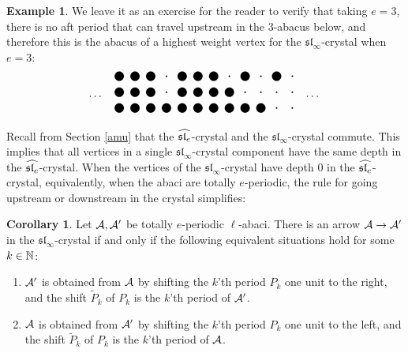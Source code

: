 \documentclass[12pt]{amsart}
\numberwithin{equation}{section}
\theoremstyle{definition}
\newtheorem{corollary}[equation]{Corollary}
\newtheorem{example}[equation]{Example}
\newcommand\TikZ[1]{\begin{matrix}\begin{tikzpicture}#1\end{tikzpicture}\end{matrix}}
\newcommand{\slinf}{\mathfrak{sl}_\infty}
\begin{document}
\begin{example} We leave it as an exercise for the reader to verify that taking $e=3$, there is no aft period that can travel upstream in the $3$-abacus below, and therefore this is the abacus of a highest weight vertex for the $\slinf$-crystal when $e=3$:
$$\dots\quad\TikZ{[scale=.5]
\draw
(11,0)node[fill,circle,inner sep=.5pt]{}
(11,1)node[fill,circle,inner sep=.5pt]{}
(11,2)node[fill,circle,inner sep=.5pt]{}
(10,0)node[fill,circle,inner sep=.5pt]{}
(10,1)node[fill,circle,inner sep=.5pt]{}
(10,2)node[fill,circle,inner sep=3pt]{}
(9,0)node[fill,circle,inner sep=3pt]{}
(9,1)node[fill,circle,inner sep=.5pt]{}
(9,2)node[fill,circle,inner sep=.5pt]{}
(8,0)node[fill,circle,inner sep=3pt]{}
(8,1)node[fill,circle,inner sep=.5pt]{}
(8,2)node[fill,circle,inner sep=3pt]{}
(7,0)node[fill,circle,inner sep=3pt]{}
(7,1)node[fill,circle,inner sep=3pt]{}
(7,2)node[fill,circle,inner sep=.5pt]{}
(6,0)node[fill,circle,inner sep=3pt]{}
(6,1)node[fill,circle,inner sep=3pt]{}
(6,2)node[fill,circle,inner sep=3pt]{}
(5,0)node[fill,circle,inner sep=3pt]{}
(5,1)node[fill,circle,inner sep=3pt]{}
(5,2)node[fill,circle,inner sep=3pt]{}
(4,0)node[fill,circle,inner sep=3pt]{}
(4,1)node[fill,circle,inner sep=3pt]{}
(4,2)node[fill,circle,inner sep=3pt]{}
(3,0)node[fill,circle,inner sep=3pt]{}
(3,1)node[fill,circle,inner sep=.5pt]{}
(3,2)node[fill,circle,inner sep=.5pt]{}
(2,0)node[fill,circle,inner sep=3pt]{}
(2,1)node[fill,circle,inner sep=3pt]{}
(2,2)node[fill,circle,inner sep=3pt]{}
(1,0)node[fill,circle,inner sep=3pt]{}
(1,1)node[fill,circle,inner sep=3pt]{}
(1,2)node[fill,circle,inner sep=3pt]{}
(0,0)node[fill,circle,inner sep=3pt]{}
(0,1)node[fill,circle,inner sep=3pt]{}
(0,2)node[fill,circle,inner sep=3pt]{};
}\quad\dots$$
\end{example}

Recall from Section \ref{amu} that the $\widehat{\mathfrak{sl}_e}$-crystal and the $\slinf$-crystal commute. This implies that all vertices in a single $\slinf$-crystal component have the same depth in the $\widehat{\mathfrak{sl}_e}$-crystal. When the vertices of the $\slinf$-crystal have depth $0$ in the $\widehat{\mathfrak{sl}_e}$-crystal, equivalently, when the abaci are totally $e$-periodic, the rule for going upstream or downstream in the crystal simplifies:



\begin{corollary}\label{coredge}Let $\mathcal{A},\mathcal{A}'$ be totally $e$-periodic $\ell$-abaci. 
There is an arrow $\mathcal{A}\to\mathcal{A}'$ in the $\slinf$-crystal if and only if the following equivalent situations hold for some $k\in\mathbb{N}$:
\begin{enumerate}
\item $\mathcal{A}'$ is obtained from $\mathcal{A}$ by shifting the $k$'th period $P_k$ one unit to the right, and the shift $\tilde{P}_k$ of $P_k$ is the $k$'th period of $\mathcal{A}'$. 
\item $\mathcal{A}$ is obtained from $\mathcal{A}'$ by shifting the $k$'th period $P_k$ one unit to the left, and the shift $\tilde{P}_k$ of $P_k$ is the $k$'th period of $\mathcal{A}$. 
\end{enumerate}
\end{corollary}
\end{document}
